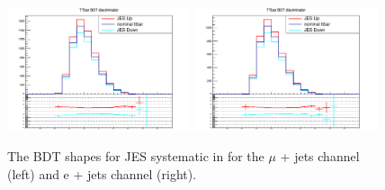 



\begin{figure}[ht!]
    \includegraphics[width=0.48\textwidth]{images/Run2/Sys/JESsystt.pdf}
    \includegraphics[width=0.48\textwidth]{images/Run2/Sys/JESsystt_e.pdf}     
    \caption{The BDT shapes for JES systematic in \ttbar for the $\mu$ + jets channel (left) and e + jets channel (right).}
    \label{fig:SysShapesJEStt}
\end{figure}

